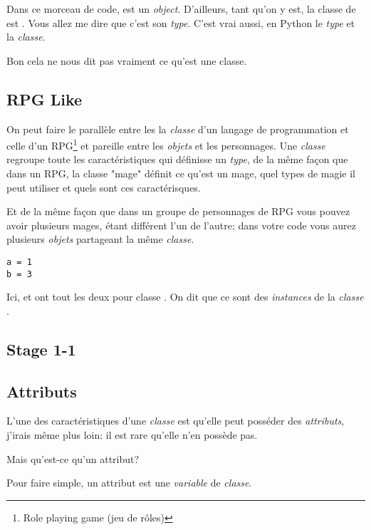 Dans ce morceau de code,  est un \emph{object}.
D'ailleurs, tant qu'on y est, la classe de  est .
Vous allez me dire que  c'est son \emph{type}. C'est vrai aussi, en Python le \emph{type} et la \emph{classe}.

Bon cela ne nous dit pas vraiment ce qu'est une classe.

\subsection{RPG Like}

On peut faire le parallèle entre les la \emph{classe} d'un langage de programmation et celle d'un RPG\footnote{Role playing game (jeu de rôles)} et pareille entre les \emph{objets} et les personnages.
Une \emph{classe} regroupe toute les caractéristiques qui définisse un \emph{type}, de la même façon que dans un RPG, la classe "mage" définit ce qu'est un mage, quel types de magie il peut utiliser et quels sont ces caractérisques.

Et de la même façon que dans un groupe de personnages de RPG vous pouvez avoir plusieurs mages, étant différent l'un de l'autre; dans votre code vous aurez plusieurs \emph{objets} partageant la même \emph{classe}.

\begin{lstlisting}
a = 1
b = 3
\end{lstlisting}

Ici,  et  ont tout les deux pour classe .
On dit que ce sont des \emph{instances} de la \emph{classe} .

\subsection{Stage 1-1}


\subsection{Attributs}

L'une des caractéristiques d'une \emph{classe} est qu'elle peut posséder des \emph{attributs}, j'irais même plus loin: il est rare qu'elle n'en possède pas.

Mais qu'est-ce qu'un attribut?

Pour faire simple, un attribut est une \emph{variable} de \emph{classe}.

